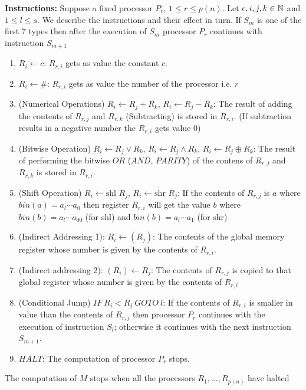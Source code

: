 \begin{definition}[PRAM]
	\textbf{Instructions:} Suppose a fixed processor $P_r$, $1\leq r\leq p(n)$. Let $c,i,j,k\in \mathbb{N}$ and $1\leq l\leq s$. We describe the instructions and their effect in turn. If $S_m$ is one of the first 7 types then after the execution of $S_m$ processor $P_r$ continues with instruction $S_{m+1}$\begin{enumerate}
		\item $R_i\leftarrow c$: $R_{r,i}$ gets as value the constant $c$.
		\item $R_i\leftarrow\#$: $R_{r,i}$ gets as value the number of the processor i.e. $r$
		\item (Numerical Operations) $R_i\leftarrow R_j+R_k$, $R_i\leftarrow R_j-R_k$: The result of adding the contents of $R_{r,j}$ and $R_{r,k}$ (Subtracting) is stored in $R_{r,i}$. (If subtraction results in a negative number the $R_{r,i}$ gets value 0)
		\item (Bitwise Operation) $R_i\leftarrow R_j\vee R_k$, $R_i\leftarrow R_j\wedge R_k$, $R_i\leftarrow R_j\oplus R_k$: The result of performing the bitwise $OR$ ($AND$, $PARITY$) of the contens of $R_{r,j}$ and $R_{r,k}$ is stored in $R_{r,i}$.
	\item (Shift Operation) $R_i\leftarrow \text{shl }R_j$, $R_i\leftarrow \text{shr }R_j$: If the contents of $R_{r,j}$ is $a$ where $bin (a)=a_{l}\cdots a_0$ then register $R_{r,i}$ will get the value $b$ where $bin(b)=a_l\cdots a_00$ (for shl) and $bin(b)=a_l\cdots a_1$ (for shr)
	\item (Indirect Addressing 1): $R_i\leftarrow (R_j)$: The contents of the global memory register whose number is given by the contents of $R_{r,i}$.
	\item (Indirect addressing 2): $(R_i)\leftarrow R_j$: The contents of $R_{r,j}$ is copied to that global register whose number is given by the contents of $R_{r,i}$
	\item (Conditional Jump) $IF\ R_i<R_j\ GOTO\ l$: If the contents of $R_{r,i}$ is smaller in value than the contents of $R_{r,j}$ then processor $P_r$ continues with the execution of instruction $S_l$; otherwise it continues with the next instruction $S_{m+1}$.
	\item $HALT$: The computation of processor $P_r$ stops.
	\end{enumerate}
The computation of $M$ stops when all the processors $R_1,\dots, R_{p(n)}$ have halted
\end{definition}


